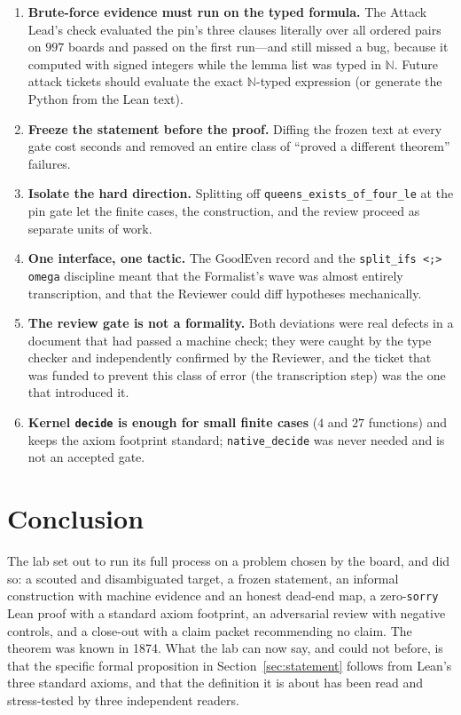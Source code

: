 \documentclass[11pt,a4paper]{article}
\theoremstyle{definition}
\theoremstyle{remark}
\newcommand{\lean}[1]{\texttt{#1}}
\newcommand{\N}{\mathbb{N}}
\newcommand{\GoodEven}{\mathrm{GoodEven}}
\begin{document}
\begin{enumerate}[nosep]
\item \textbf{Brute-force evidence must run on the typed formula.} The Attack Lead's
check evaluated the pin's three clauses literally over all ordered pairs on $997$ boards and
passed on the first run---and still missed a bug, because it computed with signed integers
while the lemma list was typed in $\N$. Future attack tickets should evaluate the exact
$\N$-typed expression (or generate the Python from the Lean text).
\item \textbf{Freeze the statement before the proof.} Diffing the frozen text at every
gate cost seconds and removed an entire class of ``proved a different theorem'' failures.
\item \textbf{Isolate the hard direction.} Splitting off \lean{queens\_exists\_of\_four\_le}
at the pin gate let the finite cases, the construction, and the review proceed as separate
units of work.
\item \textbf{One interface, one tactic.} The $\GoodEven$ record and the
\lean{split\_ifs <;> omega} discipline meant that the Formalist's wave was almost entirely
transcription, and that the Reviewer could diff hypotheses mechanically.
\item \textbf{The review gate is not a formality.} Both deviations were real defects in a
document that had passed a machine check; they were caught by the type checker and
independently confirmed by the Reviewer, and the ticket that was funded to prevent this
class of error (the transcription step) was the one that introduced it.
\item \textbf{Kernel \lean{decide} is enough for small finite cases} ($4$ and $27$
functions) and keeps the axiom footprint standard; \lean{native\_decide} was never needed
and is not an accepted gate.
\end{enumerate}

\section{Conclusion}

The lab set out to run its full process on a problem chosen by the board, and did so: a
scouted and disambiguated target, a frozen statement, an informal construction with
machine evidence and an honest dead-end map, a zero-\lean{sorry} Lean proof with a standard
axiom footprint, an adversarial review with negative controls, and a close-out with a
claim packet recommending no claim. The theorem was known in 1874. What the lab can now
say, and could not before, is that the specific formal proposition in
Section~\ref{sec:statement} follows from Lean's three standard axioms, and that the
definition it is about has been read and stress-tested by three independent readers.
\end{document}

